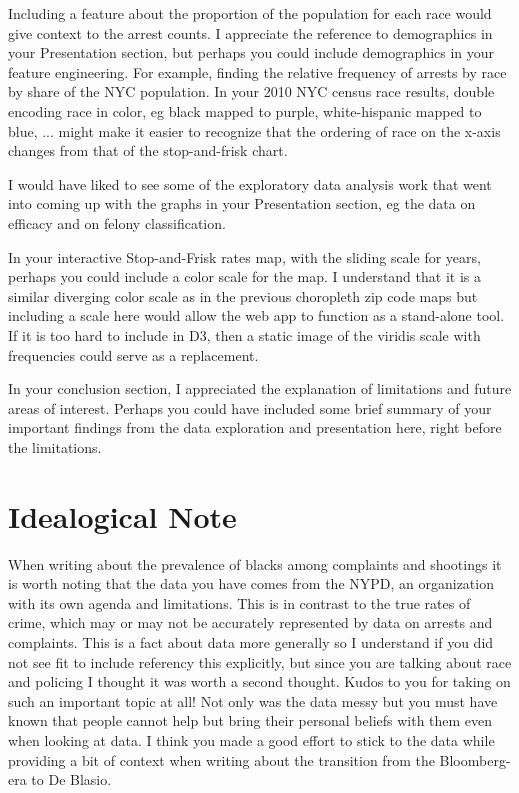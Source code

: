 \documentclass{article}
\begin{document}
Including a feature about the proportion of the population for each race would give context to the arrest counts. I appreciate the reference to demographics in your Presentation section, but perhaps you could include demographics in your feature engineering. For example, finding the relative frequency of arrests by race by share of the NYC population. In your 2010 NYC census race results, double encoding race in color, eg black mapped to purple, white-hispanic mapped to blue, ... might make it easier to recognize that the ordering of race on the x-axis changes from that of the stop-and-frisk chart.

I would have liked to see some of the exploratory data analysis work that went into coming up with the graphs in your Presentation section, eg the data on efficacy and on felony classification.

In your interactive Stop-and-Frisk rates map, with the sliding scale for years, perhaps you could include a color scale for the map. I understand that it is a similar diverging color scale as in the previous choropleth zip code maps but including a scale here would allow the web app to function as a stand-alone tool. If it is too hard to include in D3, then a static image of the viridis scale with frequencies could serve as a replacement.

In your conclusion section, I appreciated the explanation of limitations and future areas of interest. Perhaps you could have included some brief summary of your important findings from the data exploration and presentation here, right before the limitations.

\section{Idealogical Note}
When writing about the prevalence of blacks among complaints and shootings it is worth noting that the data you have comes from the NYPD, an organization with its own agenda and limitations. This is in contrast to the true rates of crime, which may or may not be accurately represented by data on arrests and complaints. This is a fact about data more generally so I understand if you did not see fit to include referency this explicitly, but since you are talking about race and policing I thought it was worth a second thought. Kudos to you for taking on such an important topic at all! Not only was the data messy but you must have known that people cannot help but bring their personal beliefs with them even when looking at data. I think you made a good effort to stick to the data while providing a bit of context when writing about the transition from the Bloomberg-era to De Blasio.
\end{document}
